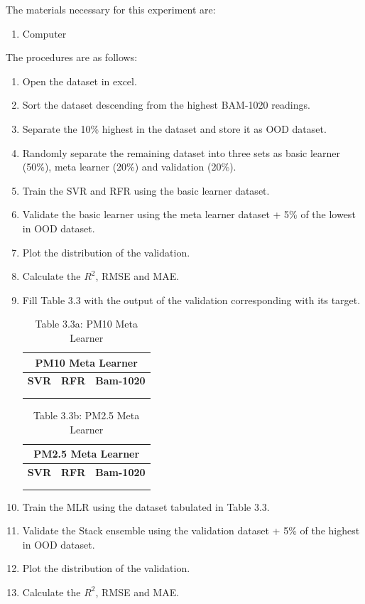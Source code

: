 \noindent The materials necessary for this experiment are:
\begin{enumerate}
	\item Computer
\end{enumerate}

\noindent The procedures are as follows:
\begin{enumerate}
	\item Open the dataset in excel.
	\item Sort the dataset descending from the highest BAM-1020 readings.
	\item Separate the 10\% highest in the dataset and store it as OOD dataset.
	\item Randomly separate the remaining dataset into three sets as basic learner (50\%), meta learner (20\%) and validation (20\%).
	\item Train the SVR and RFR using the basic learner dataset.
	\item Validate the basic learner using the meta learner dataset + 5\% of the lowest in OOD dataset.
	\item Plot the distribution of the validation.
	\item Calculate the $R^2$, RMSE and MAE.
	\item Fill Table 3.3 with the output of the validation corresponding with its target.
	
	\begin{table}[htbp]
		\centering
		\renewcommand{\arraystretch}{1.3}
		\begin{tabular}{|c|c|c|}
			\hline
			\multicolumn{3}{|c|}{\textbf{PM10 Meta Learner}} \\ \hline
			\textbf{SVR} & \textbf{RFR} & \textbf{Bam-1020} \\ \hline
			& & \\ \hline
			& & \\ \hline
		\end{tabular}
		\caption{Table 3.3a: PM10 Meta Learner}
		\label{tab:meta_pm10}
	\end{table}
	
	\begin{table}[htbp]
		\centering
		\renewcommand{\arraystretch}{1.3}
		\begin{tabular}{|c|c|c|}
			\hline
			\multicolumn{3}{|c|}{\textbf{PM2.5 Meta Learner}} \\ \hline
			\textbf{SVR} & \textbf{RFR} & \textbf{Bam-1020} \\ \hline
			& & \\ \hline
			& & \\ \hline
		\end{tabular}
		\caption{Table 3.3b: PM2.5 Meta Learner}
		\label{tab:meta_pm25}
	\end{table}
	
	\item Train the MLR using the dataset tabulated in Table 3.3.
	\item Validate the Stack ensemble using the validation dataset + 5\% of the highest in OOD dataset.
	\item Plot the distribution of the validation.
	\item Calculate the $R^2$, RMSE and MAE.
\end{enumerate}